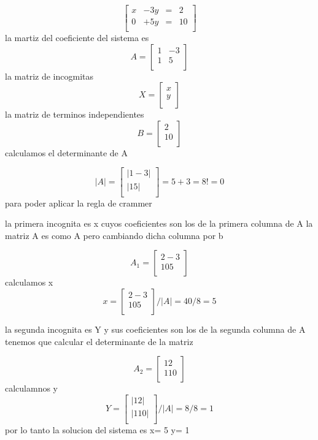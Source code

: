 \documentclass{article}
\begin{document}
\[
    \begin{bmatrix}
        x & -3y & = & 2  \\
        0 & +5y & = & 10 \\
        \end{bmatrix}
\]
la martiz del coeficiente del sistema es
\[
    A = 
    \begin{bmatrix}
        1 & -3 \\
        1 & 5  \\
        \end{bmatrix}
\]
la matriz de incogmitas
\[
    X = 
    \begin{bmatrix}
      x \\
      y  \\
        \end{bmatrix}
\]
la matriz de terminos independientes
\[
    B =
    \begin{bmatrix}
      2 \\
      10  \\
    \end{bmatrix}
\]
calculamos el determinante de A

\[
    |A| =
    \begin{bmatrix}
       | 1 - 3 |  \\
       | 1   5 | \\
    \end{bmatrix}
    = 5 + 3
    = 8 != 0
\]
para poder aplicar la regla de crammer

la primera incognita es x cuyos coeficientes son los de la primera columna de A
la matriz A es como A pero cambiando dicha columna por b

\[
    A_1 =
    \begin{bmatrix}
        2 - 3  \\
        10   5  \\
    \end{bmatrix}
\]
calculamos x
\[
    x =
    \begin{bmatrix}
        2 - 3  \\
        10   5  \\
    \end{bmatrix}
    / | A |
    = 40/8 = 5
\]

la segunda incognita es Y y sus coeficientes son los de la segunda columna de A
tenemos que calcular el determinante de la matriz

\[
    A_2 =
    \begin{bmatrix}
        1 2  \\
        1  10  \\
    \end{bmatrix}
\]
calculamnos y
\[
    Y =
    \begin{bmatrix}
       | 1 2  | \\
       | 1  10|   \\
    \end{bmatrix}
    / | A |
    = 8/8 = 1
\]
por lo tanto la solucion del sistema es 
x= 5
y= 1
\end{document}
